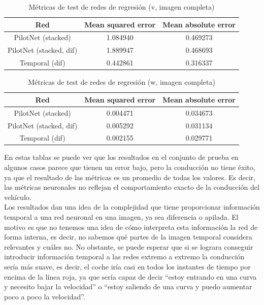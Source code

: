 \begin{table}[H]
\centering
\caption{Métricas de test de redes de regresión (v, imagen completa)}
\label{metricas_regresion_temporal_completa_v}
\begin{tabular}{c|c|c|}
\cline{1-3}
                        \multicolumn{1}{|c|}{Red}    & Mean squared error       & Mean absolute error             \\ \hline
\multicolumn{1}{|c|}{PilotNet (stacked)}   & 1.084940    & 0.469273  \\ \hline
\multicolumn{1}{|c|}{PilotNet (stacked, dif)}     & 1.889947    & 0.468693        \\ \hline
\multicolumn{1}{|c|}{Temporal (dif)}      & 0.442861     & 0.316337   \\ \hline
\end{tabular}
\end{table}


\begin{table}[H]
\centering
\caption{Métricas de test de redes de regresión (w, imagen completa)}
\label{metricas_regresion_temporal_completa_w}
\begin{tabular}{c|c|c|}
\cline{1-3}
                        \multicolumn{1}{|c|}{Red}    & Mean squared error       & Mean absolute error             \\ \hline
\multicolumn{1}{|c|}{PilotNet (stacked)}   & 0.004471    & 0.034673   \\ \hline
\multicolumn{1}{|c|}{PilotNet (stacked, dif)}     & 0.005292    & 0.031134        \\ \hline
\multicolumn{1}{|c|}{Temporal (dif)}      & 0.002155     & 0.029771   \\ \hline
\end{tabular}
\end{table}


En estas tablas se puede ver que los resultados en el conjunto de prueba en algunos casos parece que tienen un error bajo, pero la conducción no tiene éxito, ya que el resultado de las métricas es un promedio de todas los valores. Es decir, las métricas neuronales no reflejan el comportamiento exacto de la conducción del vehículo.\\


Los resultados dan una idea de la complejidad que tiene proporcionar información temporal a una red neuronal en una imagen, ya sea diferencia o apilada. El motivo es que no tenemos una idea de cómo interpreta esta información la red de forma interna, es decir, no sabemos qué partes de la imagen temporal considera relevantes y cuáles no. No obstante, se puede esperar que si se lograra conseguir introducir información temporal a las redes extremo a extremo la conducción sería más suave, es decir, el coche iría casi en todos los instantes de tiempo por encima de la línea roja, ya que sería capaz de decir ``estoy entrando en una curva y necesito bajar la velocidad'' o ``estoy saliendo de una curva y puedo aumentar poco a poco la velocidad''.\\


